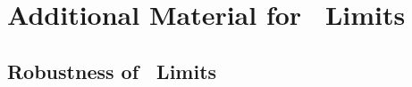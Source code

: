 \clearpage
\appendix
{}

\graphicspath{{Chapters/AppendixTGC/Figures/}}
\chapter{Additional Material for \TGC\ Limits }
\label{appendix:TGC}


\section{Robustness of \TGC\ Limits}
\label{appendix:TGC-Robustness}

